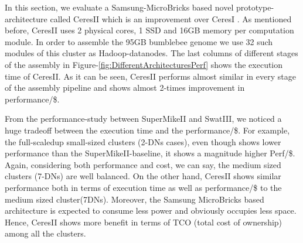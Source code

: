 \documentclass[conference]{IEEEtran}
\begin{document}
In this section, we evaluate a Samsung-MicroBricks based novel prototype-architecture called CeresII which is an improvement over CeresI \cite{Cluster:ceres1}.
As mentioned before, CeresII uses 2 physical cores, 1 SSD and 16GB memory per computation module.
In order to assemble the 95GB bumblebee genome we use 32 such modules of this cluster as Hadoop-datanodes.
The last columns of different stages of the assembly in Figure-\ref{fig:DifferentArchitecturesPerf} shows the execution time of CeresII.
As it can be seen, CeresII performs almost similar in every stage of the assembly pipeline and shows almost 2-times improvement in performance/\$.

From the performance-study between SuperMikeII and SwatIII, we noticed a huge tradeoff between the execution time and the performance/\$. 
For example, the full-scaledup small-sized clusters (2-DNs cases), even though shows lower performance than the SuperMikeII-baseline, it shows a magnitude higher Perf/\$. Again, considering both performance and cost, we can say, the medium sized clusters (7-DNs) are well balanced.
On the other hand, CeresII shows similar performance both in terms of execution time as well as performance/\$ to the medium sized cluster(7DNs). Moreover, the Samsung MicroBricks based architecture is expected to consume less power and obviously occupies less space. Hence, CeresII shows more benefit in terms of TCO (total cost of ownership) among all the clusters.


\end{document}
